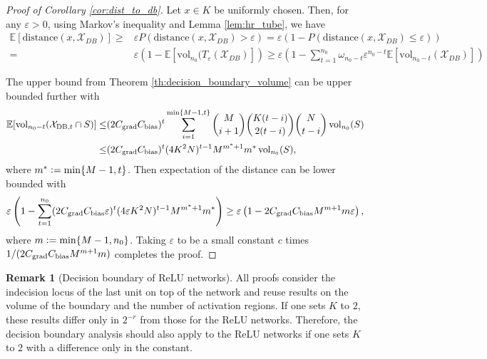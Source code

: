 \documentclass{article}
\theoremstyle{definition}
\newtheorem{remark}[theorem]{Remark}
\newcommand{\cbias}{C_{\text{\normalfont bias}}}
\newcommand{\cgrad}{C_{\text{\normalfont grad}}}
\newcommand{\defeq}{\vcentcolon=}
\newcommand{\nin}{n_0}
\newcommand{\vol}{\operatorname{vol}}
\begin{document}
\cordbdistance*
\begin{proof}[Proof of Corollary \ref{cor:dist_to_db}]
    Let $x \in K$ be uniformly chosen. Then, for any $\varepsilon > 0$, using Markov’s inequality and Lemma \ref{lem:hr_tube}, we have
    \begin{align*}
        \mathbb{E} [\text{distance}(x, \mathcal{X}_{DB} )]
        \geq &\varepsilon P(\text{distance} (x, \mathcal{X}_{DB} ) > \varepsilon)
        = \varepsilon (1 - P (\text{distance}(x, \mathcal{X}_{DB} ) \leq \varepsilon))\\
        = & \varepsilon \left(1 - \mathbb{E} \left[\text{vol}_{\nin} (T_{\varepsilon} (\mathcal{X}_{DB} ) \right] \right)
        \geq \varepsilon \left( 1 - \sum_{t=1}^{\nin} \omega_{\nin - t} \varepsilon^{\nin - t} \mathbb{E}\left[ \text{vol}_{\nin - t} (\mathcal{X}_{DB}) \right] \right)
    \end{align*}
    
    The upper bound from Theorem \ref{th:decision_boundary_volume} can be upper bounded further with
    \begin{align*}
        \mathbb{E}[\vol_{\nin - t}(\mathcal{X}_{\text{DB}, t} \cap S)] \leq & (2 \cgrad \cbias)^t\sum_{i = 1} ^{\min\{M - 1, t\}}  \binom{M}{i + 1} \binom{K(t - i)}{2 (t - i)} \binom{N}{t - i} \vol_{\nin}(S)\\
        \leq & (2 \cgrad \cbias)^t (4 K^2 N)^{t-1} M^{m^* + 1} m^* \vol_{\nin}(S),
    \end{align*}
    where $m^* \defeq \min\{M - 1, t\}$.
    Then expectation of the distance can be lower bounded with
    \begin{align*}
        \varepsilon \left( 1 - \sum_{t=1}^{\nin} (2 \cgrad \cbias \varepsilon)^t (4 \varepsilon K^2 N)^{t-1} M^{m^* + 1} m^* \right)
        \geq
        \varepsilon \left( 1 - 2 \cgrad \cbias M^{m + 1} m \varepsilon \right),
    \end{align*}
    where $m \defeq \min\{M - 1, \nin \}$.
    Taking $\varepsilon$ to be 
    a small constant $c$ times
    $1 / ( 2 \cgrad \cbias M^{m + 1} m)$ completes the proof.
\end{proof}

\begin{remark}[Decision boundary of ReLU networks]
    All proofs consider the indecision locus of the last unit on top of the network and reuse results on the volume of the boundary and the number of activation regions. If one sets $K$ to $2$, these results differ only in $2^{-r}$ from those for the ReLU networks. Therefore, the decision boundary analysis should also apply to the ReLU networks if one sets $K$ to $2$ with a difference only in the constant. 
\end{remark}
\end{document}
